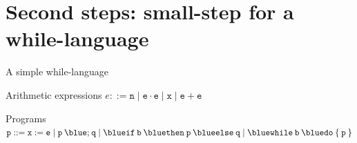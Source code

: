 \documentclass{beamer}
\begin{document}
\section{Second steps: small-step for a while-language}

\begin{frame}{A simple while-language}

        \vspace{0.7cm}
	\begin{block}{Arithmetic expressions}
	$e ::=  \mathtt{n}  \mid \mathtt{e \cdot e}
        \mid  \mathtt{x}  \mid \mathtt{e + e}$
	\end{block}

	\vspace{0.7cm}
	\begin{block}{Programs}
        $\prog{p} ::= \mathtt{x} := \mathtt{e} \mid
	\mathtt{p \> {\blue ;} \> q} \mid
	\mathtt{{\blue if} \> b \> {\blue then} \> p \> {\blue else} \> q} \mid
	\mathtt{{\blue while} \> b \> {\blue do} \> \{ \> p \> \}}$
	\end{block}

\end{frame}
\end{document}
